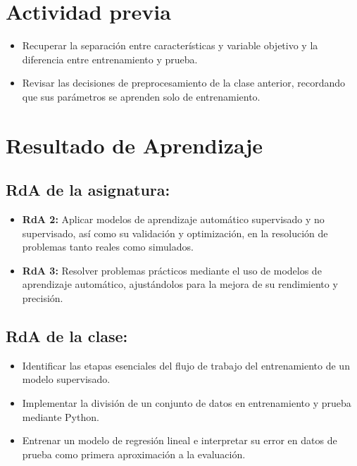 \documentclass[a4,11pt]{aleph-notas}
\begin{document}
\encabezado
\section*{Actividad previa}

\begin{itemize}
    \item Recuperar la separación entre características y variable objetivo y la diferencia entre entrenamiento y prueba.
    \item Revisar las decisiones de preprocesamiento de la clase anterior, recordando que sus parámetros se aprenden solo de entrenamiento.
\end{itemize}


\section*{Resultado de Aprendizaje}

\subsection*{RdA de la asignatura:}

\begin{itemize}[leftmargin=*]
    \item \textbf{RdA 2:} Aplicar modelos de aprendizaje automático supervisado y no supervisado, así como su validación y optimización, en la resolución de problemas tanto reales como simulados.
    \item \textbf{RdA 3:} Resolver problemas prácticos mediante el uso de modelos de aprendizaje automático, ajustándolos para la mejora de su rendimiento y precisión.
\end{itemize}

\subsection*{RdA de la clase:}

\begin{itemize}[leftmargin=*]
\item Identificar las etapas esenciales del flujo de trabajo del entrenamiento de un modelo supervisado.
\item Implementar la división de un conjunto de datos en entrenamiento y prueba mediante Python.
\item Entrenar un modelo de regresión lineal e interpretar su error en datos de prueba como primera aproximación a la evaluación.
\end{itemize}
\end{document}

